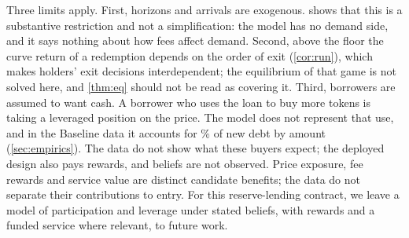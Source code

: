 Three limits apply. First, horizons and arrivals are exogenous.  shows that this is a substantive restriction and not a simplification: the model has no demand side, and it says nothing about how fees affect demand. Second, above the floor the curve return of a redemption depends on the order of exit (\cref{cor:run}), which makes holders' exit decisions interdependent; the equilibrium of that game is not solved here, and \cref{thm:eq} should not be read as covering it. Third, borrowers are assumed to want cash. A borrower who uses the loan to buy more tokens is taking a leveraged position on the price. The model does not represent that use, and in the Baseline data it accounts for \ELeverAmtPct\% of new debt by amount (\cref{sec:empirics}). The data do not show what these buyers expect; the deployed design also pays rewards, and beliefs are not observed. Price exposure, fee rewards and service value are distinct candidate benefits; the data do not separate their contributions to entry. For this reserve-lending contract, we leave a model of participation and leverage under stated beliefs, with rewards and a funded service where relevant, to future work.
